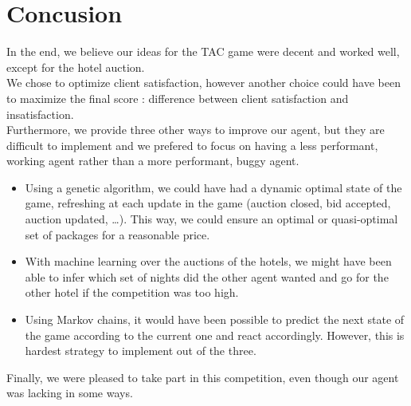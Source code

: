 \section*{Concusion}

In the end, we believe our ideas for the TAC game were decent and worked well, except for the hotel auction.\\
We chose to optimize client satisfaction, however another choice could have been to maximize the final score : difference between client satisfaction and insatisfaction.\\
Furthermore, we provide three other ways to improve our agent, but they are difficult to implement and we prefered to focus on having a less performant, working agent rather than a more performant, buggy agent.
\begin{itemize}
    \item Using a genetic algorithm, we could have had a dynamic optimal state of the game, refreshing at each update in the game (auction closed, bid accepted, auction updated, \dots ). This way, we could ensure an optimal or quasi-optimal set of packages for a reasonable price.
    \item With machine learning over the auctions of the hotels, we might have been able to infer which set of nights did the other agent wanted and go for the other hotel if the competition was too high.
    \item Using Markov chains, it would have been possible to predict the next state of the game according to the current one and react accordingly. However, this is hardest strategy to implement out of the three.
\end{itemize}

Finally, we were pleased to take part in this competition, even though our agent was lacking in some ways.
